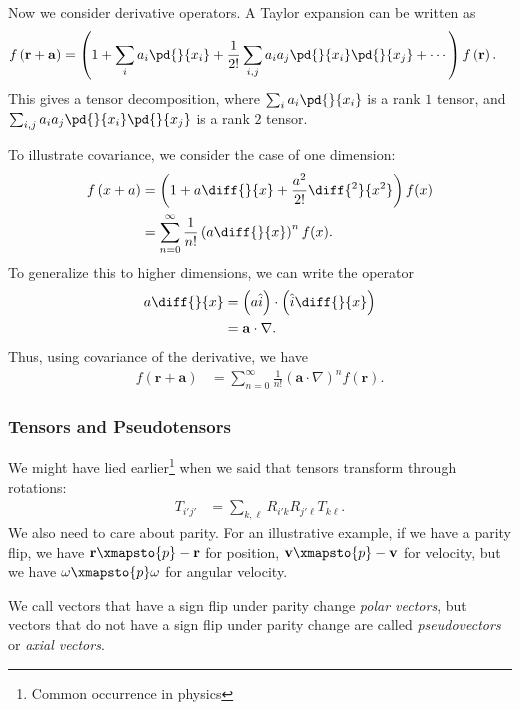 \documentclass[10pt]{mypackage}
\begin{document}
  Now we consider derivative operators. A Taylor expansion can be written as
  \begin{align*}
    f\left( \mathbf{r} + \mathbf{a} \right) &= \left( 1 + \sum_{i}a_i \pd{}{x_i} + \frac{1}{2!}\sum_{i,j}a_ia_j\pd{}{x_i}\pd{}{x_j} + \cdots \right) f\left( \mathbf{r} \right).
  \end{align*}
  This gives a tensor decomposition, where $\sum_{i}a_i \pd{}{x_i}$ is a rank $1$ tensor, and $\sum_{i,j}a_ia_j \pd{}{x_i}\pd{}{x_j}$ is a rank $2$ tensor.\newline

  To illustrate covariance, we consider the case of one dimension:
  \begin{align*}
    f\left( x + a \right) &= \left( 1 + a \diff{}{x} + \frac{a^2}{2!}\diff{^2}{x^2} \right)f(x)\\
                          &= \sum_{n=0}^{\infty}\frac{1}{n!}\left( a \diff{}{x} \right)^{n} f(x).
  \end{align*}
  To generalize this to higher dimensions, we can write the operator 
  \begin{align*}
    a \diff{}{x} &= \left( a\hat{i} \right)\cdot \left( \hat{i} \diff{}{x} \right)\\
    &= \mathbf{a}\cdot \nabla.
  \end{align*}
  Thus, using covariance of the derivative, we have
  \begin{align*}
    f\left( \mathbf{r} + \mathbf{a} \right) &= \sum_{n=0}^{\infty}\frac{1}{n!}\left( \mathbf{a}\cdot \nabla \right)^n f\left( \mathbf{r} \right).
  \end{align*}
  \subsubsection{Tensors and Pseudotensors}%
  We might have lied earlier\footnote{Common occurrence in physics} when we said that tensors transform through rotations:
  \begin{align*}
    T_{i'j'} &= \sum_{k,\ell} R_{i' k}R_{j' \ell}T_{k \ell}.
  \end{align*}
  We also need to care about parity. For an illustrative example, if we have a parity flip, we have $\mathbf{r}\xmapsto{p} -\mathbf{r}$ for position, $\mathbf{v}\xmapsto{p}-\mathbf{v}$ for velocity, but we have $\mathbf{\omega}\xmapsto{p} \mathbf{\omega}$ for angular velocity.\newline

  We call vectors that have a sign flip under parity change \textit{polar vectors}, but vectors that do not have a sign flip under parity change are called \textit{pseudovectors} or \textit{axial vectors}.\newline
\end{document}
